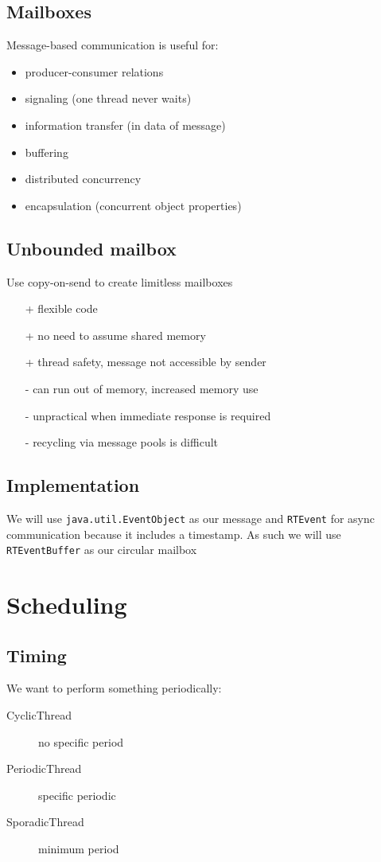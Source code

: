 \documentclass[]{article}
\theoremstyle{definition}
\begin{document}
	\subsection{Mailboxes}
	Message-based communication is useful for:
	\begin{itemize}
		\item producer-consumer relations
		\item signaling (one thread never waits)
		\item information transfer (in data of message)
		\item buffering
		\item distributed concurrency
		\item encapsulation (concurrent object properties)
	\end{itemize}

	\subsection{Unbounded mailbox}
	Use copy-on-send to create limitless mailboxes
	\begin{itemize}
		\item[+] flexible code
		\item[+] no need to assume shared memory
		\item[+] thread safety, message not accessible by sender
		\item[-] can run out of memory, increased memory use
		\item[-] unpractical when immediate response is required
		\item[-] recycling via message pools is difficult
	\end{itemize}

	\subsection{Implementation}
	We will use \lstinline|java.util.EventObject| as our message and \lstinline|RTEvent| for async communication because it includes a timestamp. As such we will use \lstinline|RTEventBuffer| as our circular mailbox
	\section{Scheduling}
	\subsection{Timing}
	We want to perform something periodically:
	\begin{description}
		\item[CyclicThread]	no specific period
		\item[PeriodicThread] specific periodic
		\item[SporadicThread] minimum period
	\end{description}
\end{document}
